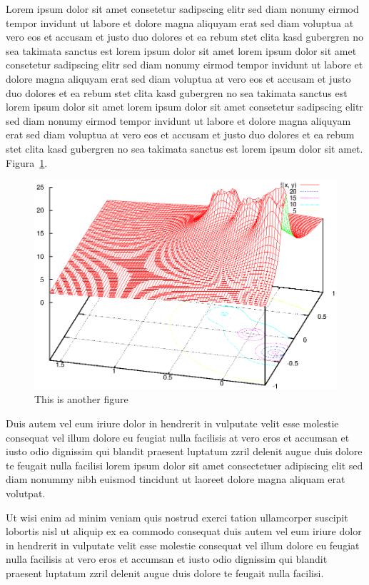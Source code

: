 \documentclass[sigconf]{acmart}
\begin{document}
Lorem ipsum dolor sit amet consetetur sadipscing elitr sed diam
nonumy eirmod tempor invidunt ut labore et dolore magna aliquyam
erat sed diam voluptua at vero eos et accusam et justo duo dolores
et ea rebum stet clita kasd gubergren no sea takimata sanctus est
lorem ipsum dolor sit amet lorem ipsum dolor sit amet consetetur
sadipscing elitr sed diam nonumy eirmod tempor invidunt ut labore
et dolore magna aliquyam erat sed diam voluptua at vero eos et
accusam et justo duo dolores et ea rebum stet clita kasd gubergren
no sea takimata sanctus est lorem ipsum dolor sit amet lorem ipsum
dolor sit amet consetetur sadipscing elitr sed diam nonumy eirmod
tempor invidunt ut labore et dolore magna aliquyam erat sed diam
voluptua at vero eos et accusam et justo duo dolores et ea rebum
stet clita kasd gubergren no sea takimata sanctus est lorem ipsum
dolor sit amet. Figura~\ref{fig:fig2}.

\begin{figure}[ht]
  \centering
  \includegraphics[width=\linewidth]{fig/exemplo1}
\caption{\label{fig:fig2}This is another figure}
\end{figure}

Duis autem vel eum iriure dolor in hendrerit in vulputate velit
esse molestie consequat vel illum dolore eu feugiat nulla
facilisis at vero eros et accumsan et iusto odio dignissim qui
blandit praesent luptatum zzril delenit augue duis dolore te
feugait nulla facilisi lorem ipsum dolor sit amet consectetuer
adipiscing elit sed diam nonummy nibh euismod tincidunt ut laoreet
dolore magna aliquam erat volutpat.

Ut wisi enim ad minim veniam quis nostrud exerci tation
ullamcorper suscipit lobortis nisl ut aliquip ex ea commodo
consequat duis autem vel eum iriure dolor in hendrerit in
vulputate velit esse molestie consequat vel illum dolore eu
feugiat nulla facilisis at vero eros et accumsan et iusto odio
dignissim qui blandit praesent luptatum zzril delenit augue duis
dolore te feugait nulla facilisi.
\end{document}
